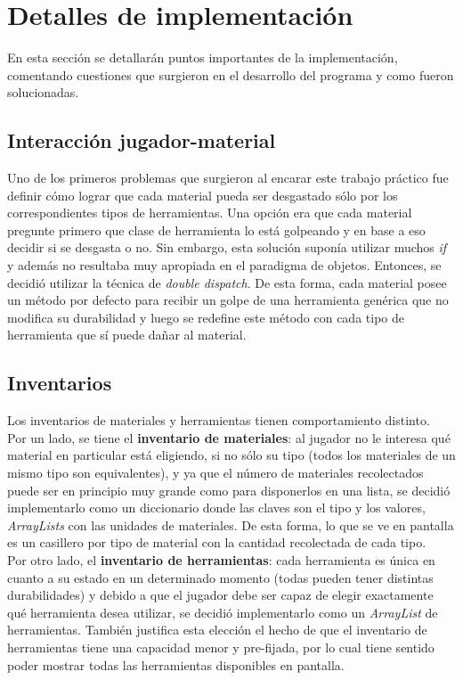 \documentclass[titlepage,a4paper]{article}
\begin{document}
\section{Detalles de implementación}\label{sec:implementacion}
En esta sección se detallarán puntos importantes de la implementación, comentando cuestiones que surgieron en el desarrollo del programa y como fueron solucionadas.
\subsection{Interacción jugador-material}
	Uno de los primeros problemas que surgieron al encarar este trabajo práctico fue definir cómo lograr que cada material pueda ser desgastado sólo por los correspondientes tipos de herramientas. Una opción era que cada material pregunte primero que clase de herramienta lo está golpeando y en base a eso decidir si se desgasta o no. Sin embargo, esta solución suponía utilizar muchos \emph{if} y además no resultaba muy apropiada en el paradigma de objetos. Entonces, se decidió utilizar la técnica de \emph{double dispatch}. De esta forma, cada material posee un método por defecto para recibir un golpe de una herramienta genérica que no modifica su durabilidad y luego se redefine este método con cada tipo de herramienta que sí puede dañar al material.
\subsection{Inventarios}
	Los inventarios de materiales y herramientas tienen comportamiento distinto.\\Por un lado, se tiene el \textbf{inventario de materiales}: al jugador no le interesa qué material en particular está eligiendo, si no sólo su tipo (todos los materiales de un mismo tipo son equivalentes), y ya que el número de materiales recolectados puede ser en principio muy grande como para disponerlos en una lista, se decidió implementarlo como un diccionario donde las claves son el tipo y los valores, \emph{ArrayLists} con las unidades de materiales. De esta forma, lo que se ve en pantalla es un casillero por tipo de material con la cantidad recolectada de cada tipo.\\
Por otro lado, el \textbf{inventario de herramientas}: cada herramienta es única en cuanto a su estado en un determinado momento (todas pueden tener distintas durabilidades) y debido a que el jugador debe ser capaz de elegir exactamente qué herramienta desea utilizar, se decidió implementarlo como un \emph{ArrayList} de herramientas. También justifica esta elección el hecho de que el inventario de herramientas tiene una capacidad menor y pre-fijada, por lo cual tiene sentido poder mostrar todas las herramientas disponibles en pantalla.
\end{document}
